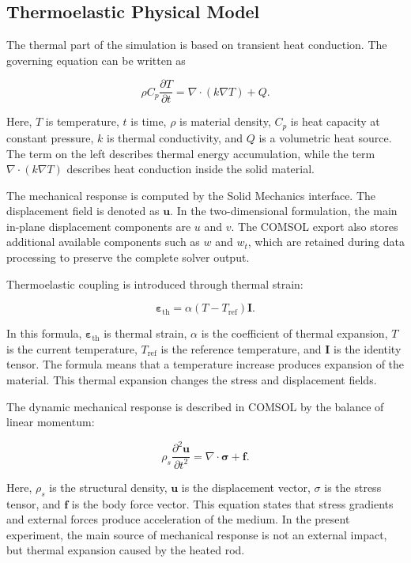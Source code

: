 \subsection{Thermoelastic Physical Model}

The thermal part of the simulation is based on transient heat conduction. The governing equation can be written as

\[
\rho C_p \frac{\partial T}{\partial t}
=
\nabla \cdot \left( k \nabla T \right) + Q .
\]

Here, \(T\) is temperature, \(t\) is time, \(\rho\) is material density, \(C_p\) is heat capacity at constant pressure, \(k\) is thermal conductivity, and \(Q\) is a volumetric heat source. The term on the left describes thermal energy accumulation, while the term \(\nabla \cdot (k \nabla T)\) describes heat conduction inside the solid material.

The mechanical response is computed by the Solid Mechanics interface. The displacement field is denoted as \(\mathbf{u}\). In the two-dimensional formulation, the main in-plane displacement components are \(u\) and \(v\). The COMSOL export also stores additional available components such as \(w\) and \(w_t\), which are retained during data processing to preserve the complete solver output.

Thermoelastic coupling is introduced through thermal strain:

\[
\boldsymbol{\varepsilon}_{\mathrm{th}}
=
\alpha
\left(
T - T_{\mathrm{ref}}
\right)
\mathbf{I}.
\]

In this formula, \(\boldsymbol{\varepsilon}_{\mathrm{th}}\) is thermal strain, \(\alpha\) is the coefficient of thermal expansion, \(T\) is the current temperature, \(T_{\mathrm{ref}}\) is the reference temperature, and \(\mathbf{I}\) is the identity tensor. The formula means that a temperature increase produces expansion of the material. This thermal expansion changes the stress and displacement fields.

The dynamic mechanical response is described in COMSOL by the balance of linear momentum:

\[
\rho_s
\frac{\partial^2 \mathbf{u}}{\partial t^2}
=
\nabla \cdot \boldsymbol{\sigma}
+
\mathbf{f}.
\]

Here, \(\rho_s\) is the structural density, \(\mathbf{u}\) is the displacement vector, \({\sigma}\) is the stress tensor, and \(\mathbf{f}\) is the body force vector. This equation states that stress gradients and external forces produce acceleration of the medium. In the present experiment, the main source of mechanical response is not an external impact, but thermal expansion caused by the heated rod.

